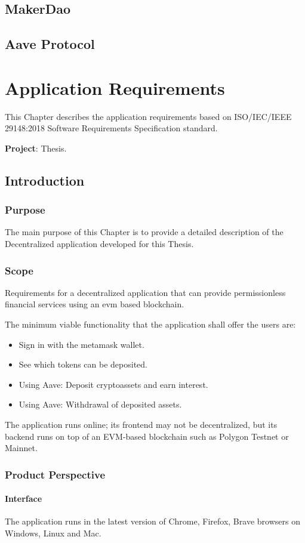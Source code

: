 \documentclass[11pt,a4paper]{report}
\begin{document}
\section{MakerDao}\label{sec:maker}
\section{Aave Protocol}\label{sec:aave}
\chapter{Application Requirements} \label{ch:appreq}
This Chapter describes the application requirements based on ISO/IEC/IEEE 29148:2018\cite{iso} Software Requirements Specification standard.

\textbf{Project}: Thesis.
\section{Introduction}
\subsection{Purpose}
The main purpose of this Chapter is to provide a detailed description of the Decentralized application developed for this Thesis. 
\subsection{Scope}
Requirements for a decentralized application that can provide
permissionless financial services using an evm based blockchain.

The minimum viable functionality that the application shall offer the users are:
\begin{itemize}
	\item Sign in with the metamask wallet.
	\item See which tokens can be deposited.
	\item Using Aave: Deposit cryptoassets and earn interest. 
	\item Using Aave: Withdrawal of deposited assets.
\end{itemize}
The application runs online; its frontend may not be decentralized, but its backend runs on top of an EVM-based blockchain such as Polygon Testnet or Mainnet.
\subsection{Product Perspective}
\subsubsection{Interface}
The application runs in the latest version of Chrome, Firefox, Brave browsers on Windows, Linux and Mac.
\end{document}
